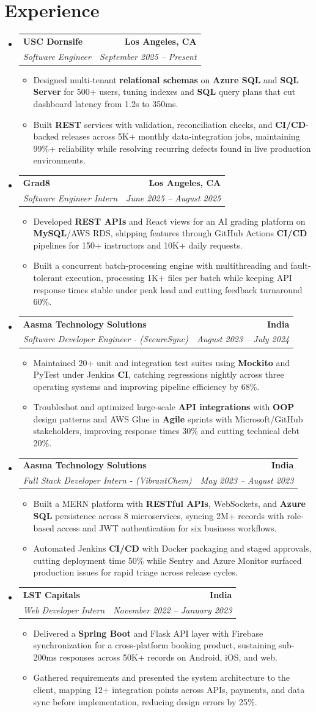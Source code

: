 \documentclass[letterpaper,10pt]{article}
\makeatletter
\newcommand{\itemTail}{\vspace{-4pt}}
\newcommand{\sectionGap}{\vspace{-8pt}}
\newcommand{\roleGap}{\vspace{2pt}}
\newcommand{\resumeItem}[1]{\item\small{{#1 \itemTail}}}
\newcommand{\resumeSubheading}[4]{\vspace{-1pt}\item\begin{tabular*}{1.0\textwidth}[t]{l@{\extracolsep{\fill}}r}\textbf{#1} & \textbf{\small #2} \\\textit{\small#3} & \textit{\small #4} \\\end{tabular*}\vspace{-2pt}}
\newcommand{\resumeSubHeadingListStart}{\begin{itemize}[leftmargin=0.0in, label={}]}
\newcommand{\resumeSubHeadingListEnd}{\end{itemize}}
\newcommand{\resumeItemListStart}{\begin{itemize}[leftmargin=0.15in,label=\textbullet,itemsep=3pt,topsep=0pt,parsep=0pt,partopsep=0pt]}
\newcommand{\resumeItemListEnd}{\end{itemize}\vspace{-4pt}}
\makeatother
\begin{document}
\section{Experience}
\resumeSubHeadingListStart
\resumeSubheading{USC Dornsife}{Los Angeles, CA}{Software Engineer}{September 2025 -- Present}
\resumeItemListStart
\resumeItem{Designed multi-tenant \textbf{relational schemas} on \textbf{Azure SQL} and \textbf{SQL Server} for 500+ users, tuning indexes and \textbf{SQL} query plans that cut dashboard latency from 1.2s to 350ms.}
\resumeItem{Built \textbf{REST} services with validation, reconciliation checks, and \textbf{CI/CD}-backed releases across 5K+ monthly data-integration jobs, maintaining 99\%+ reliability while resolving recurring defects found in live production environments.}
\resumeItemListEnd
\roleGap
\resumeSubheading{Grad8}{Los Angeles, CA}{Software Engineer Intern}{June 2025 -- August 2025}
\resumeItemListStart
\resumeItem{Developed \textbf{REST APIs} and React views for an AI grading platform on \textbf{MySQL}/AWS RDS, shipping features through GitHub Actions \textbf{CI/CD} pipelines for 150+ instructors and 10K+ daily requests.}
\resumeItem{Built a concurrent batch-processing engine with multithreading and fault-tolerant execution, processing 1K+ files per batch while keeping API response times stable under peak load and cutting feedback turnaround 60\%.}
\resumeItemListEnd
\roleGap
\resumeSubheading{Aasma Technology Solutions}{India}{Software Developer Engineer - (SecureSync)}{August 2023 -- July 2024}
\resumeItemListStart
\resumeItem{Maintained 20+ unit and integration test suites using \textbf{Mockito} and PyTest under Jenkins \textbf{CI}, catching regressions nightly across three operating systems and improving pipeline efficiency by 68\%.}
\resumeItem{Troubleshot and optimized large-scale \textbf{API integrations} with \textbf{OOP} design patterns and AWS Glue in \textbf{Agile} sprints with Microsoft/GitHub stakeholders, improving response times 30\% and cutting technical debt 20\%.}
\resumeItemListEnd
\roleGap
\resumeSubheading{Aasma Technology Solutions}{India}{Full Stack Developer Intern - (VibrantChem)}{May 2023 -- August 2023}
\resumeItemListStart
\resumeItem{Built a MERN platform with \textbf{RESTful APIs}, WebSockets, and \textbf{Azure SQL} persistence across 8 microservices, syncing 2M+ records with role-based access and JWT authentication for six business workflows.}
\resumeItem{Automated Jenkins \textbf{CI/CD} with Docker packaging and staged approvals, cutting deployment time 50\% while Sentry and Azure Monitor surfaced production issues for rapid triage across release cycles.}
\resumeItemListEnd
\roleGap
\resumeSubheading{LST Capitals}{India}{Web Developer Intern}{November 2022 -- January 2023}
\resumeItemListStart
\resumeItem{Delivered a \textbf{Spring Boot} and Flask API layer with Firebase synchronization for a cross-platform booking product, sustaining sub-200ms responses across 50K+ records on Android, iOS, and web.}
\resumeItem{Gathered requirements and presented the system architecture to the client, mapping 12+ integration points across APIs, payments, and data sync before implementation, reducing design errors by 25\%.}
\resumeItemListEnd
\resumeSubHeadingListEnd
\sectionGap
\end{document}
